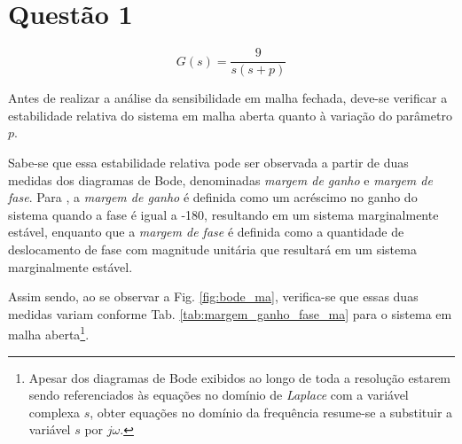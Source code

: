 

\chapter*{Questão 1}

\begin{equation}\nonumber
G(s) = \frac{9}{s(s+p)}
\end{equation}


\vspace{0.5cm}


\vspace{0.25cm}

Antes de realizar a análise da sensibilidade em malha fechada, deve-se verificar
a estabilidade relativa do sistema em malha aberta quanto à variação do
parâmetro $p$. 

Sabe-se que essa estabilidade relativa pode ser observada a partir de duas
medidas dos diagramas de Bode, denominadas {\it margem de ganho} e {\it margem
de fase}. Para , a {\it margem de ganho} é definida como
um acréscimo no ganho do sistema quando a fase é igual a -180\textdegree,
resultando em um sistema marginalmente estável, enquanto que a {\it margem de
fase} é definida como a quantidade de deslocamento de fase com magnitude
unitária que resultará em um sistema marginalmente estável.

Assim sendo, ao se observar a Fig. \ref{fig:bode_ma}, verifica-se que essas duas
medidas variam conforme Tab. \ref{tab:margem_ganho_fase_ma} para o sistema em
malha aberta\footnote{Apesar dos diagramas de Bode exibidos ao longo de toda a
resolução estarem sendo referenciados às equações no domínio de {\it Laplace}
com a variável complexa $s$, obter equações no domínio da frequência resume-se a
substituir a variável $s$ por $j\omega$.}.

